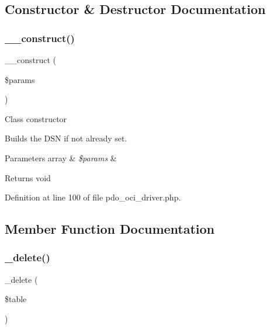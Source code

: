 \subsection{Constructor \& Destructor Documentation}
\mbox{\label{class_c_i___d_b__pdo__oci__driver_a9162320adff1a1a4afd7f2372f753a3e}} 
\subsubsection{\texorpdfstring{\_\_construct()}{\_\_construct()}}
{\footnotesize\ttfamily \+\_\+\+\_\+construct (\begin{DoxyParamCaption}\item[{}]{\$params }\end{DoxyParamCaption})}

Class constructor

Builds the D\+SN if not already set.


\begin{DoxyParams}[1]{Parameters}
array & {\em \$params} & \\
\hline
\end{DoxyParams}
\begin{DoxyReturn}{Returns}
void 
\end{DoxyReturn}


Definition at line 100 of file pdo\+\_\+oci\+\_\+driver.\+php.



\subsection{Member Function Documentation}
\mbox{\label{class_c_i___d_b__pdo__oci__driver_a133ea8446ded52589bd22cc9163d0896}} 
\subsubsection{\texorpdfstring{\_delete()}{\_delete()}}
{\footnotesize\ttfamily \+\_\+delete (\begin{DoxyParamCaption}\item[{}]{\$table }\end{DoxyParamCaption})\hspace{0.3cm}{\ttfamily [protected]}}

